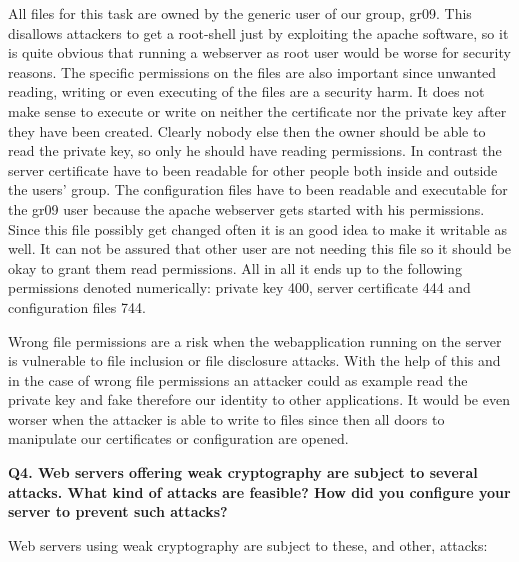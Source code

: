 \noindent
All files for this task are owned by the generic user of our group, gr09. This disallows attackers to get a root-shell just by exploiting the apache software, so it is quite obvious that running a webserver as root user would be worse for security reasons. The specific permissions on the files are also important since unwanted reading, writing or even executing of the files are a security harm. It does not make sense to execute or write on neither the certificate nor the private key after they have been created. Clearly nobody else then the owner should be able to read the private key, so only he should have reading permissions. In contrast the server certificate have to been readable for other people both inside and outside the users' group. The configuration files have to been readable and executable for the gr09 user because the apache webserver gets started with his permissions. Since this file possibly get changed often it is an good idea to make it writable as well. 
It can not be assured that other user are not needing this file so it should be okay to grant them read permissions. All in all it ends up to the following permissions denoted numerically: private key 400, server certificate 444 and configuration files 744. 
\newline

\noindent
Wrong file permissions are a risk when the webapplication running on the server is vulnerable to file inclusion or file disclosure attacks. With the help of this and in the case of wrong file permissions an attacker could as example read the private key and fake therefore our identity to other applications. It would be even worser when the attacker is able to write to files since then all doors to manipulate our certificates or configuration are opened.
\newline


\noindent
{\bf Q4. Web servers offering weak cryptography are subject to several attacks.
What kind of attacks are feasible? How did you configure your server to prevent such attacks?}
\newline

\noindent
Web servers using weak cryptography are subject to these, and other, attacks:

